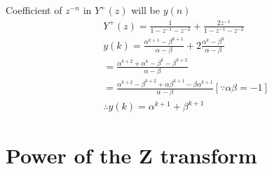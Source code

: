 \documentclass[journal,12pt,twocolumn]{IEEEtran}
\renewcommand\thesection{\arabic{section}}
\begin{document}
\begin{enumerate}[label=\thesection.\arabic*,ref=\thesection.\theenumi]
Coefficient of $z^{-n}$ in $Y^{+}(z)$ will be $y(n)$
\begin{align}
&Y^{+}(z)=\frac{1}{1-z^{-1}-z^{-2}}+\frac{2z^{-1}}{1-z^{-1}-z^{-2}}\\
&y(k)=\frac{\alpha^{k+1}-\beta^{k+1}}{\alpha - \beta} +2\frac{\alpha^{k}-\beta^{k}}{\alpha - \beta}\\
&=\frac{\alpha^{k+2}+\alpha^{k}-\beta^{k}-\beta^{k+2}}{\alpha-\beta}\\
&=\frac{\alpha^{k+2}-\beta^{k+2}+\alpha \beta^{k+1}-\beta \alpha^{k+1}}{\alpha-\beta} [\because \alpha \beta=-1]\\
&\therefore y(k)=\alpha^{k+1}+\beta^{k+1}
\end{align}
\end{enumerate}
\section{Power of the Z transform}
\end{document}
